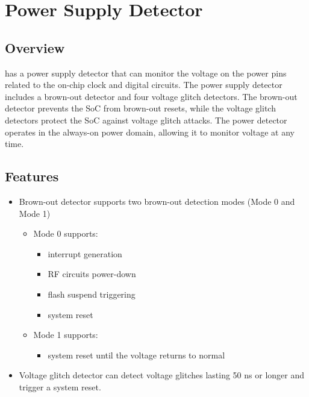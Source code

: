 \documentclass[main\_\_EN.tex]{subfiles}
\begin{document}

\ifglobal
\else
    \listoftodos
    {\let\clearpage\relax \listofdonetodos}
    \tableofcontents
\fi



\hypertarget{psdet}{}
\chapter{Power Supply Detector}
\label{mod:psdet}

\section{Overview}

\chipname{} has a power supply detector that can monitor the voltage on the power pins related to the on-chip clock and digital circuits. The power supply detector includes a brown-out detector and four voltage glitch detectors. The brown-out detector prevents the SoC from brown-out resets, while the voltage glitch detectors protect the SoC against voltage glitch attacks. The power detector operates in the always-on power domain, allowing it to monitor voltage at any time.


\section{Features}
\label{sec:psdet-features}

\begin{itemize}
    \item Brown-out detector supports two brown-out detection modes (Mode 0 and Mode 1)
    \begin{itemize}
        \item Mode 0 supports:
            \begin{itemize}
            \item interrupt generation
            \item RF circuits power-down
            \item flash suspend triggering
            \item system reset
            \end{itemize}
        \item Mode 1 supports:
            \begin{itemize}
            \item system reset until the voltage returns to normal
            \end{itemize}
    \end{itemize}
    \item Voltage glitch detector can detect voltage glitches lasting 50 ns or longer and trigger a system reset.
\end{itemize}
\end{document}

